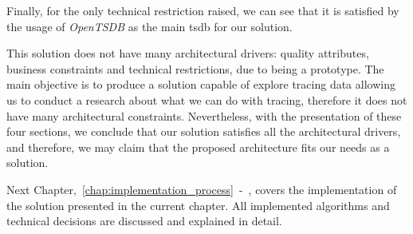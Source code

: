 


Finally, for the only technical restriction raised, we can see that it is satisfied by the usage of \emph{OpenTSDB} as the main \gls{tsdb} for our solution.

This solution does not have many architectural drivers: quality attributes, business constraints and technical restrictions, due to being a prototype. The main objective is to produce a solution capable of explore tracing data allowing us to conduct a research about what we can do with tracing, therefore it does not have many architectural constraints. Nevertheless, with the presentation of these four sections, we conclude that our solution satisfies all the architectural drivers, and therefore, we may claim that the proposed architecture fits our needs as a solution.

Next Chapter,~\ref{chap:implementation_process}~-~, covers the implementation of the solution presented in the current chapter. All implemented algorithms and technical decisions are discussed and explained in detail.

